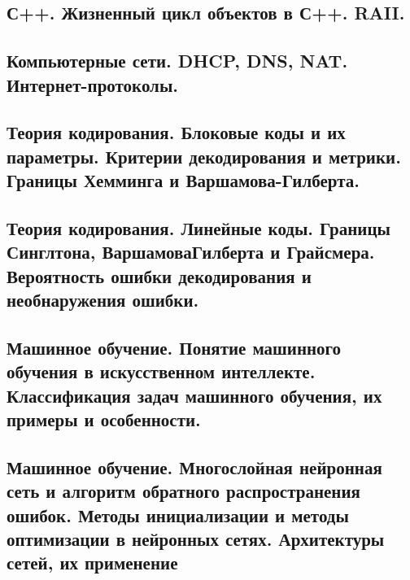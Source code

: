 \documentclass{article}
\begin{document}


\subsection{С++. Жизненный цикл объектов в С++. RAII.}





















\subsection{Компьютерные сети. DHCP, DNS, NAT. Интернет-протоколы.}







\subsection{Теория кодирования. Блоковые коды и их параметры. Критерии декодирования и метрики. Границы Хемминга и Варшамова-Гилберта.}

\subsection{Теория кодирования. Линейные коды. Границы Синглтона, ВаршамоваГилберта и Грайсмера. Вероятность ошибки декодирования и необнаружения ошибки.}

\subsection{Машинное обучение. Понятие машинного обучения в искусственном интеллекте. Классификация задач машинного обучения, их примеры и особенности.}

\subsection{Машинное обучение. Многослойная нейронная сеть и алгоритм обратного распространения ошибок. Методы инициализации и методы оптимизации в нейронных сетях. Архитектуры сетей, их применение}
\end{document}
